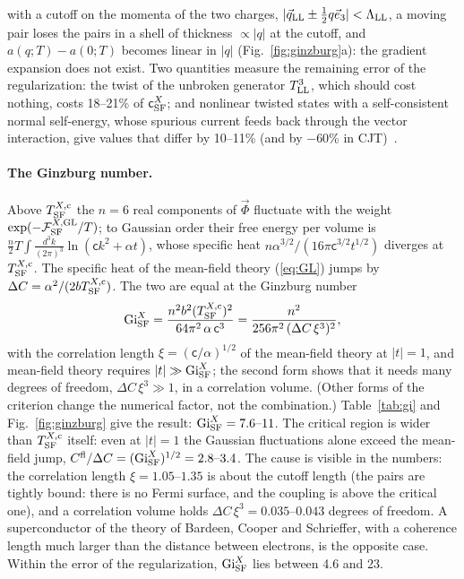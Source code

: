\documentclass[aps,prd,twocolumn,superscriptaddress,nofootinbib,floatfix,longbibliography]{revtex4-2}
\newcommand{\LL}{{\rm LL}}
\newcommand{\SF}{{\rm SF}}
\begin{document}
with a cutoff on the momenta of the two charges, $|\vec q_\LL\pm\frac12q\vec e_3|<\Lambda_\LL$, a moving pair loses the pairs in a
shell of thickness $\propto|q|$ at the cutoff, and $a(q;T)-a(0;T)$ becomes linear in $|q|$ (Fig.~\ref{fig:ginzburg}a): the
gradient expansion does not exist. Two quantities measure the remaining error of the regularization: the twist of the
unbroken generator $T^3_\LL$, which should cost nothing, costs 18\mbox{--}21\% of $\mathsf c^X_\SF$; and nonlinear twisted
states with a self-consistent normal self-energy, whose spurious current feeds back through the vector interaction, give
values that differ by 10\mbox{--}11\% (and by $-$60\% in CJT)~\cite{SM}.

\paragraph*{The Ginzburg number.}
Above $T^{X,{\rm c}}_\SF$ the $n=6$ real components of $\vec\Phi$ fluctuate with the weight $\exp(-\mathcal F^{X,{\rm GL}}_\SF/T)$; to
Gaussian order their free energy per volume is $\frac n2T\int\frac{d^3k}{(2\pi)^3}\ln(\mathsf c k^2+\alpha t)$, whose specific
heat $n\alpha^{3/2}/(16\pi\mathsf c^{3/2}t^{1/2})$ diverges at $T^{X,{\rm c}}_\SF$. The specific heat of the mean-field theory
(\ref{eq:GL}) jumps by $\Delta C=\alpha^2/(2bT^{X,{\rm c}}_\SF)$. The two are equal at the Ginzburg
number~\cite{Levanyuk1959,Ginzburg1960}
\begin{equation}
{\rm Gi}^X_\SF=\frac{n^2b^2(T^{X,{\rm c}}_\SF)^2}{64\pi^2\,\alpha\,\mathsf c^3}=\frac{n^2}{256\pi^2\,(\Delta C\,\xi^3)^2},
\label{eq:Gi}
\end{equation}
with the correlation length $\xi=(\mathsf c/\alpha)^{1/2}$ of the mean-field theory at $|t|=1$, and mean-field theory requires $|t|\gg{\rm Gi}^X_\SF$; the second form shows that it needs many degrees of freedom,
$\Delta C\,\xi^3\gg1$, in a correlation volume. (Other forms of the criterion change the numerical factor, not the
combination.) Table~\ref{tab:gi} and Fig.~\ref{fig:ginzburg} give the result:
${\rm Gi}^X_\SF=7.6\mbox{--}11$. The critical region is wider than $T^{X,{\rm c}}_\SF$ itself: even at $|t|=1$ the Gaussian
fluctuations alone exceed the mean-field jump, $C^{\rm fl}/\Delta C=({\rm Gi}^X_\SF)^{1/2}=2.8\mbox{--}3.4$. The cause is
visible in the numbers: the correlation length $\xi=1.05\mbox{--}1.35$ is about the cutoff length (the pairs are tightly bound:
there is no Fermi surface, and the coupling is above the critical one), and a correlation volume holds
$\Delta C\,\xi^3=0.035\mbox{--}0.043$ degrees of freedom. A superconductor of the theory of Bardeen, Cooper and Schrieffer, with a
coherence length much larger than the distance between electrons, is the opposite case. Within the error of the
regularization, ${\rm Gi}^X_\SF$ lies between 4.6 and 23.
\end{document}
